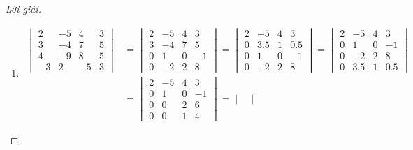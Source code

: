 \documentclass[class=linearalgebra,crop=false]{standalone}
\begin{document}
\begin{proof}[Lời giải]
    \begin{enumerate}[label = (\alph*)]
        \item
              \begin{align*}
                  \begin{vmatrix}
                      2  & -5 & 4  & 3 \\
                      3  & -4 & 7  & 5 \\
                      4  & -9 & 8  & 5 \\
                      -3 & 2  & -5 & 3
                  \end{vmatrix}
                   & =
                  \begin{vmatrix}
                      2 & -5 & 4 & 3  \\
                      3 & -4 & 7 & 5  \\
                      0 & 1  & 0 & -1 \\
                      0 & -2 & 2 & 8
                  \end{vmatrix}
                  =
                  \begin{vmatrix}
                      2 & -5  & 4 & 3   \\
                      0 & 3.5 & 1 & 0.5 \\
                      0 & 1   & 0 & -1  \\
                      0 & -2  & 2 & 8
                  \end{vmatrix}
                  =
                  \begin{vmatrix}
                      2 & -5  & 4 & 3   \\
                      0 & 1   & 0 & -1  \\
                      0 & -2  & 2 & 8   \\
                      0 & 3.5 & 1 & 0.5
                  \end{vmatrix} \\
                   & =
                  \begin{vmatrix}
                      2 & -5 & 4 & 3  \\
                      0 & 1  & 0 & -1 \\
                      0 & 0  & 2 & 6  \\
                      0 & 0  & 1 & 4
                  \end{vmatrix}
                  =
                  \begin{vmatrix}

\end{vmatrix}
\end{align*}
\end{enumerate}
\end{proof}
\end{document}
